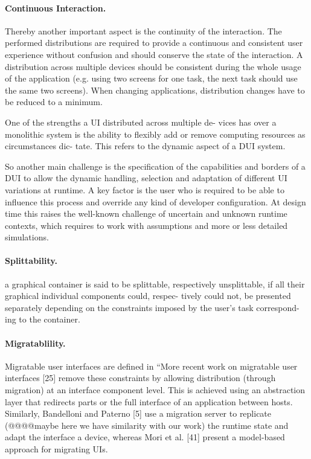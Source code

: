 \paragraph{Continuous Interaction.}
\cite{blumendorf2011distributed}
Thereby another important aspect is the continuity of the interaction. The
performed distributions are required to provide a continuous and consistent user
experience without confusion and should conserve the state of the interaction. A
distribution across multiple devices should be consistent during the whole usage
of the application (e.g. using two screens for one task, the next task should use the same two screens). When changing applications, distribution changes have to be reduced to a minimum. \\


\cite{chen2011distributed} One of the strengths a UI distributed across multiple
de- vices has over a monolithic system is the ability to flexibly add or remove
computing resources as circumstances dic- tate. This refers to the dynamic
aspect of a DUI system. 

\cite{blumendorf2011distributed}
 So another main challenge is the specification of the capabilities and borders
of a DUI to allow the dynamic handling, selection and adaptation of different UI
variations at runtime. A key factor is the user who is required to be able to
influence this process and override any kind of developer configuration. At design time this raises the well-known challenge of uncertain and unknown runtime contexts, which requires to work with assumptions and more or less detailed simulations.\\


\paragraph{Splittability.}
\cite{demeure20084c} a graphical container is said to be splittable, respectively
 unsplittable, if all their graphical individual components could, respec-
 tively could not, be presented separately depending on the constraints imposed
 by the user’s task correspond- ing to the container.\\
 
\paragraph{Migratablility.}
Migratable user interfaces are defined in \cite{elmqvist2011distributed} ``More recent work on migratable user interfaces
[25] remove these constraints by allowing distribution (through migration) at an
interface component level. This is achieved using an abstraction layer that
redirects parts or the full interface of an application between hosts.
Similarly, Bandelloni and Paterno [5] use a migration server to replicate
(@@@@maybe here we have similarity with our work) the runtime state and adapt
the interface a device, whereas Mori et al.
[41] present a model-based approach for migrating UIs.

